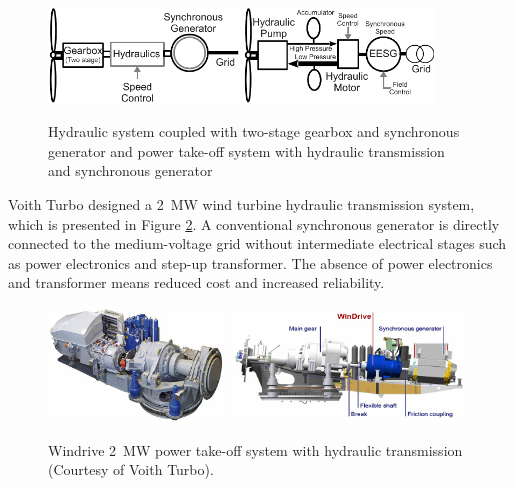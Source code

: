 \documentclass[a4paper, 11pt]{article} %
\begin{document}
  \begin{figure}[b]
    \centering
    \includegraphics[width=0.45\textwidth]{hydraulics}
    \hfill
    \includegraphics[width=0.45\textwidth]{EESG_hydraulics}
    \caption{Hydraulic system coupled with two-stage gearbox and synchronous generator and power take-off system with hydraulic transmission and synchronous generator } 
    \label{hydraulics}
  \end{figure}

Voith Turbo designed a 2~MW wind turbine hydraulic transmission system, which is presented in Figure \ref{voith}. A conventional synchronous generator is directly connected to the medium-voltage grid without intermediate electrical stages such as power electronics and step-up transformer. The absence of power electronics and transformer means reduced cost and increased reliability.

  \begin{figure}
    \centering
    \includegraphics[height=1.2in]{voith_windrive}
    \includegraphics[height=1.2in]{voith_schematic}
    \caption{Windrive 2~MW power take-off system with hydraulic transmission (Courtesy of Voith Turbo).} 
    \label{voith}
  \end{figure}
\end{document}
